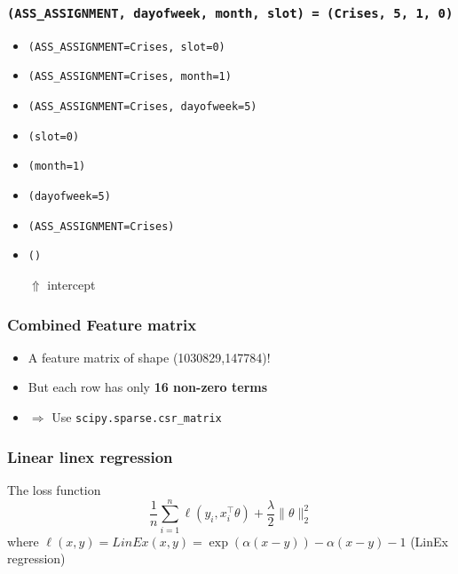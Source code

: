 \documentclass{beamer}
\begin{document}
\begin{frame}[fragile]\frametitle{\texttt{(ASS\_ASSIGNMENT, dayofweek, month, slot) 
= (Crises, 5, 1, 0)}}
\begin{itemize}[<+->]
\item
\begin{verbatim}
(ASS_ASSIGNMENT=Crises, slot=0)
\end{verbatim}
\item
\begin{verbatim}
(ASS_ASSIGNMENT=Crises, month=1)
\end{verbatim}
\item
\begin{verbatim}
(ASS_ASSIGNMENT=Crises, dayofweek=5)
\end{verbatim}
\item
\begin{verbatim}
(slot=0)
\end{verbatim}
\item
\begin{verbatim}
(month=1)
\end{verbatim}
\item
\begin{verbatim}
(dayofweek=5)
\end{verbatim}
\item
\begin{verbatim}
(ASS_ASSIGNMENT=Crises)
\end{verbatim}
\item
\begin{verbatim}
()
\end{verbatim}
\pause $\Uparrow$ intercept
\end{itemize}
\end{frame}

\begin{frame}\frametitle{Combined Feature matrix}
\begin{itemize}
\item
A feature matrix of shape (1030829,147784)! 
\item
But each row has only \textbf{16 non-zero terms}
\item
$\Rightarrow$ Use \texttt{scipy.sparse.csr\_matrix}
\end{itemize}
\end{frame}

\begin{frame}\frametitle{Linear linex regression}
The loss function
$$
\frac 1n \sum_{i=1}^n \ell(y_i,x_i^\top \theta) + \frac \lambda 2 \|\theta\|_2^2
$$
where
$\ell(x,y) = LinEx(x, y) = \exp(\alpha(x - y)) - \alpha(x-y) - 1$ (LinEx regression)
\end{frame}
\end{document}
